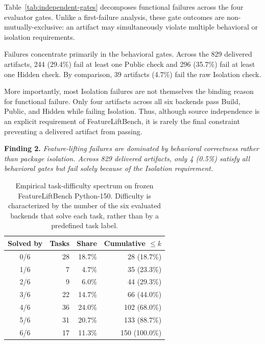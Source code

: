 \documentclass[acmsmall,screen,review,anonymous]{acmart}
\begin{document}
Table~\ref{tab:independent-gates} decomposes functional failures across
the four evaluator gates. Unlike a first-failure analysis, these gate
outcomes are non-mutually-exclusive: an artifact may simultaneously
violate multiple behavioral or isolation requirements.

Failures concentrate primarily in the behavioral gates.
Across the 829 delivered artifacts, 244 (29.4\%) fail at least one
Public check and 296 (35.7\%) fail at least one Hidden check.
By comparison, 39 artifacts (4.7\%) fail the raw Isolation check.

More importantly, most Isolation failures are not themselves the
binding reason for functional failure. Only four artifacts across all
six backends pass Build, Public, and Hidden while failing Isolation.
Thus, although source independence is an explicit requirement of
FeatureLiftBench, it is rarely the final constraint preventing a
delivered artifact from passing.

\textbf{Finding 2.}
\emph{Feature-lifting failures are dominated by behavioral correctness
rather than package isolation. Across 829 delivered artifacts, only
4 (0.5\%) satisfy all behavioral gates but fail solely because of the
Isolation requirement.}

\begin{table}[t]
  \caption{
    Empirical task-difficulty spectrum on frozen FeatureLiftBench
    Python-150. Difficulty is characterized by the number of the six
    evaluated backends that solve each task, rather than by a
    predefined task label.
  }
  \label{tab:difficulty-spectrum}
  \centering
  \small
  \setlength{\tabcolsep}{7pt}

  \begin{tabular}{crrr}
    \toprule
    \textbf{Solved by}
    & \textbf{Tasks}
    & \textbf{Share}
    & \textbf{Cumulative $\leq k$} \\
    \midrule

    0/6 & 28 & 18.7\% & 28  (18.7\%) \\
    1/6 &  7 &  4.7\% & 35  (23.3\%) \\
    2/6 &  9 &  6.0\% & 44  (29.3\%) \\
    3/6 & 22 & 14.7\% & 66  (44.0\%) \\
    4/6 & 36 & 24.0\% & 102 (68.0\%) \\
    5/6 & 31 & 20.7\% & 133 (88.7\%) \\
    6/6 & 17 & 11.3\% & 150 (100.0\%) \\

    \bottomrule
  \end{tabular}
\end{table}
\end{document}
